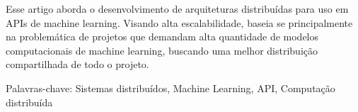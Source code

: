 \begin{resumo}
    Esse artigo aborda o desenvolvimento de arquiteturas distribuídas para uso em APIs de machine learning. Visando alta escalabilidade, baseia se principalmente na problemática de projetos que demandam alta quantidade de modelos computacionais de machine learning, buscando uma melhor distribuição compartilhada de todo o projeto. 

Palavras-chave:
Sistemas distribuídos, Machine Learning, API, Computação distribuída



\end{resumo}